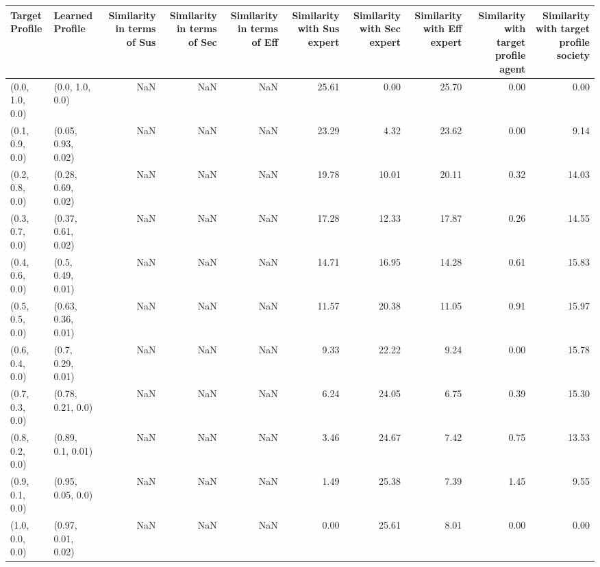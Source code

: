\begin{tabular}{llrrrrrrrr}
\toprule
Target Profile & Learned Profile & Similarity in terms of Sus & Similarity in terms of Sec & Similarity in terms of Eff & Similarity with Sus expert & Similarity with Sec expert & Similarity with Eff expert & Similarity with target profile agent & Similarity with target profile society \\
\midrule
(0.0, 1.0, 0.0) & (0.0, 1.0, 0.0) & NaN & NaN & NaN & 25.61 & 0.00 & 25.70 & 0.00 & 0.00 \\
(0.1, 0.9, 0.0) & (0.05, 0.93, 0.02) & NaN & NaN & NaN & 23.29 & 4.32 & 23.62 & 0.00 & 9.14 \\
(0.2, 0.8, 0.0) & (0.28, 0.69, 0.02) & NaN & NaN & NaN & 19.78 & 10.01 & 20.11 & 0.32 & 14.03 \\
(0.3, 0.7, 0.0) & (0.37, 0.61, 0.02) & NaN & NaN & NaN & 17.28 & 12.33 & 17.87 & 0.26 & 14.55 \\
(0.4, 0.6, 0.0) & (0.5, 0.49, 0.01) & NaN & NaN & NaN & 14.71 & 16.95 & 14.28 & 0.61 & 15.83 \\
(0.5, 0.5, 0.0) & (0.63, 0.36, 0.01) & NaN & NaN & NaN & 11.57 & 20.38 & 11.05 & 0.91 & 15.97 \\
(0.6, 0.4, 0.0) & (0.7, 0.29, 0.01) & NaN & NaN & NaN & 9.33 & 22.22 & 9.24 & 0.00 & 15.78 \\
(0.7, 0.3, 0.0) & (0.78, 0.21, 0.0) & NaN & NaN & NaN & 6.24 & 24.05 & 6.75 & 0.39 & 15.30 \\
(0.8, 0.2, 0.0) & (0.89, 0.1, 0.01) & NaN & NaN & NaN & 3.46 & 24.67 & 7.42 & 0.75 & 13.53 \\
(0.9, 0.1, 0.0) & (0.95, 0.05, 0.0) & NaN & NaN & NaN & 1.49 & 25.38 & 7.39 & 1.45 & 9.55 \\
(1.0, 0.0, 0.0) & (0.97, 0.01, 0.02) & NaN & NaN & NaN & 0.00 & 25.61 & 8.01 & 0.00 & 0.00 \\
\bottomrule
\end{tabular}
